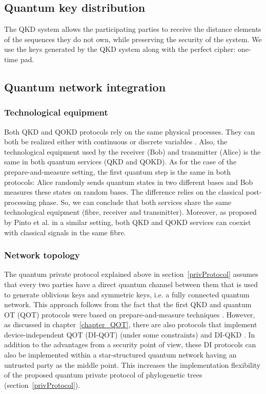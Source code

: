 \subsection{Quantum key distribution} 

The QKD system allows the participating parties to receive the distance elements of the sequences they do not own, while preserving the security of the system. We use the keys generated by the QKD system along with the perfect cipher: one-time pad. %


\subsection{Quantum network integration}

\subsubsection{Technological equipment}

Both QKD and QOKD protocols rely on the same physical processes. They can both be realized either with continuous or discrete variables \cite{Pirandola2020,Silva2019,FGSPSW18, Lemus20}. Also, the technological equipment used by the receiver (Bob) and transmitter (Alice) is the same in both quantum services (QKD and QOKD). As for the case of the prepare-and-measure setting, the first quantum step is the same in both protocols: Alice randomly sends quantum states in two different bases and Bob measures these states on random bases. The difference relies on the classical post-processing phase. So, we can conclude that both services share the same technological equipment (fibre, receiver and transmitter). Moreover, as proposed by Pinto et al. \cite{Pinto2020} in a similar setting, both QKD and QOKD services can coexist with classical signals in the same fibre.

\subsubsection{Network topology}

The quantum private protocol explained above in section~\ref{privProtocol} assumes that every two parties have a direct quantum channel between them that is used to generate oblivious keys and symmetric keys, i.e. a fully connected quantum network. This approach follows from the fact that the first QKD and quantum OT (QOT) protocols were based on prepare-and-measure techniques \cite{BB84, BBCS92}. However, as discussed in chapter~\ref{chapter_QOT}, there are also protocols that implement device-independent QOT (DI-QOT) \cite{KW16, RW20} (under some constraints) and DI-QKD \cite{Pirandola2020}. In addition to the advantages from a security point of view, these DI protocols can also be implemented within a star-structured quantum network having an untrusted party as the middle point. This increases the implementation flexibility of the proposed quantum private protocol of phylogenetic trees (section~\ref{privProtocol}).

